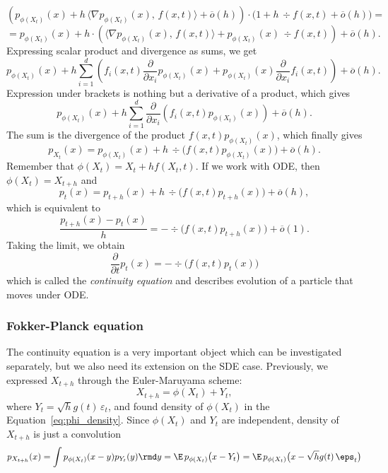 \[
    \left(p_{\phi(X_t)}(x) + h\, \Big\langle \nabla p_{\phi(X_t)}(x), \, f(x, t) \Big\rangle + \overline{o}(h)\right)\cdot \Big(1 + h\, \div f(x, t) + \overline{o}(h)\Big) = 
\]
\[
    = p_{\phi(X_t)}(x) + h \cdot \left(\Big\langle \nabla p_{\phi(X_t)}(x), \, f(x, t) \Big\rangle + p_{\phi(X_t)}(x) \, \div f(x, t)\right) + \overline{o}(h).
\]
Expressing scalar product and divergence as sums, we get
\[
    p_{\phi(X_t)}(x) + h\sum\limits_{i = 1}^{d}\left( f_i(x, t)\frac{\partial}{\partial x_i} p_{\phi(X_t)}(x) + p_{\phi(X_t)}(x) \frac{\partial}{\partial x_i} f_i(x, t) \right) + \overline{o}(h).
\]
Expression under brackets is nothing but a derivative of a product, which gives
\[
    p_{\phi(X_t)}(x) + h\sum\limits_{i = 1}^{d} \frac{\partial}{\partial x_i} \left(f_i(x, t) p_{\phi(X_t)}(x)\right) + \overline{o}(h).
\]
The sum is the divergence of the product $f(x, t)p_{\phi(X_t)}(x)$, which finally gives
\begin{equation}\label{eq:phi_density}
    p_{X_t}(x) = p_{\phi(X_t)}(x) + h\,\div\Big(f(x, t) p_{\phi(X_t)}(x)\Big) + \overline{o}(h).    
\end{equation}
Remember that $\phi(X_t) = X_t + h f(X_t, t)$. If we work with ODE, then $\phi(X_t) = X_{t + h}$ and
\[
    p_{t}(x) = p_{t + h}(x) + h \, \div\Big(f(x, t) p_{t + h}(x)\Big) + \overline{o}(h),
\]
which is equivalent to
\[
    \frac{p_{t + h}(x) - p_t(x)}{h} = -\div\Big(f(x, t)p_{t + h}(x)\Big) + \overline{o}(1).
\]
Taking the limit, we obtain
\begin{equation}\label{eq:continuity}
    \boxed{\frac{\partial}{\partial t} p_t(x) = -\div \Big(f(x, t) p_{t}(x)\Big)}
\end{equation}
which is called the \emph{continuity equation} and describes evolution of a particle that moves under ODE.

\subsubsection{Fokker-Planck equation}
The continuity equation is a very important object which can be investigated separately, but we also need its extension on the SDE case. Previously, we expressed $X_{t + h}$ through the Euler-Maruyama scheme:
\[
    X_{t + h} = \phi(X_t) + Y_t,
\]
where $Y_t = \sqrt{h} g(t) \, \varepsilon_t$, and found density of $\phi(X_t)$ in the Equation~\ref{eq:phi_density}. Since $\phi(X_t)$ and $Y_t$ are independent, density of $X_{t + h}$ is just a convolution
\[
    p_{X_{t + h}}(x) = \int p_{\phi(X_t)}(x - y) p_{Y_t}(y) \rmd y = \E\, p_{\phi(X_t)}\big(x - Y_t\big) = \E\, p_{\phi(X_t)}\big(x - \sqrt{h} g(t)\,\eps_t\big)
\]

